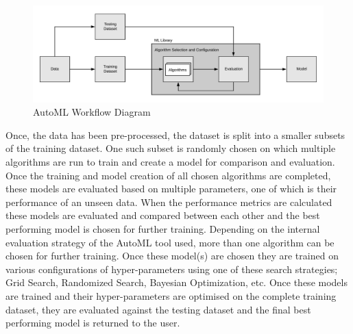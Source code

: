 \begin{figure}[t]
    \centering
    \includegraphics[width=16cm]{images/ML Workflow.jpeg}
    \caption{AutoML Workflow Diagram}
    \label{automl-workflow-diagram}
\end{figure}

Once, the data has been pre-processed, the dataset is split into a smaller subsets of the training dataset. One such subset is randomly chosen on which multiple algorithms are run to train and create a model for comparison and evaluation. Once the training and model creation of all chosen algorithms are completed, these models are evaluated based on multiple parameters, one of which is their performance of an unseen data. When the performance metrics are calculated these models are evaluated and compared between each other and the best performing model is chosen for further training. Depending on the internal evaluation strategy of the AutoML tool used, more than one algorithm can be chosen for further training. Once these model(s) are chosen they are trained on various configurations of hyper-parameters using one of these search strategies; Grid Search, Randomized Search, Bayesian Optimization, etc. Once these models are trained and their hyper-parameters are optimised on the complete training dataset, they are evaluated against the testing dataset and the final best performing model is returned to the user.

